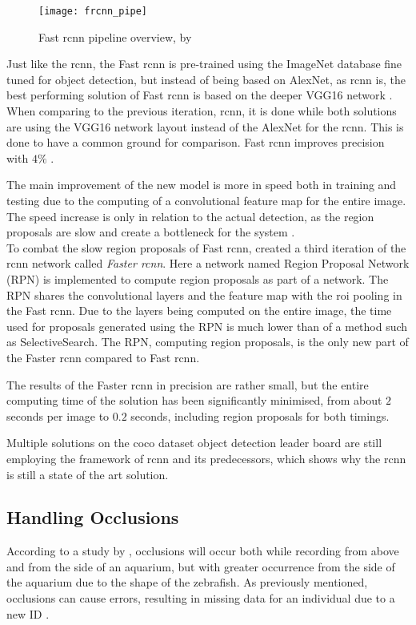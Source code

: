 \begin{figure}[H]
	\centering
	\texttt{[image: frcnn\_pipe]}
	\caption{Fast \gls{rcnn} pipeline overview, by \cite{Girshick2015}}
	\label{fig:frcnn_pipe}
\end{figure}

Just like the \gls{rcnn}, the Fast \gls{rcnn} is pre-trained using the ImageNet database fine tuned for object detection, but instead of being based on AlexNet, as \gls{rcnn} is, the best performing solution of Fast \gls{rcnn} is based on the deeper VGG16 network \citep{Girshick2015}. When comparing to the previous iteration, \gls{rcnn}, it is done while both solutions are using the VGG16 network layout instead of the AlexNet for the \gls{rcnn}. This is done to have a common ground for comparison. Fast \gls{rcnn} improves precision with $4\%$ \citep{Girshick2015}.

The main improvement of the new model is more in speed both in training and testing due to the computing of a convolutional feature map for the entire image. The speed increase is only in relation to the actual detection, as the region proposals are slow and create a bottleneck for the system \citep{Girshick2015}.\\

To combat the slow region proposals of Fast \gls{rcnn}, \cite{Ren2017} created a third iteration of the \gls{rcnn} network called \textit{Faster \gls{rcnn}}. Here a network named Region Proposal Network (RPN) is implemented to compute region proposals as part of a  network. The RPN shares the convolutional layers and the feature map with the \gls{roi} pooling in the Fast \gls{rcnn}. Due to the layers being computed on the entire image, the time used for proposals generated using the RPN is much lower than of a method such as SelectiveSearch. The RPN, computing region proposals, is the only new part of the Faster \gls{rcnn} compared to Fast \gls{rcnn}.

The results of the Faster \gls{rcnn} in precision are rather small, but the entire computing time of the solution has been significantly minimised, from about $2$ seconds per image to $0.2$ seconds, including region proposals for both timings.

Multiple solutions on the \gls{coco} dataset object detection leader board are still employing the framework of \gls{rcnn} and its predecessors, which shows why the \gls{rcnn} is still a state of the art solution.


\subsection{Handling Occlusions}
According to a study by \cite{Qian2017}, occlusions will occur both while recording from above and from the side of an aquarium, but with greater occurrence from the side of the aquarium due to the shape of the zebrafish. As previously mentioned, occlusions can cause errors, resulting in missing data for an individual due to a new ID \citep{Feijo2018}.\\

